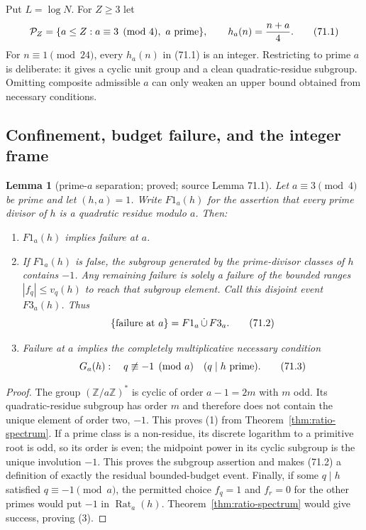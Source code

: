 \documentclass[10pt,reqno]{amsart}
\newtheorem{lemma}[theorem]{Lemma}
\theoremstyle{definition}
\newcommand{\1}{\mathbf 1}
\begin{document}
Put $L=\log N$.  For $Z\geq3$ let
\begin{equation}
 \mathcal P_Z=\{a\leq Z:a\equiv3\pmod4,\ a\hbox{ prime}\},\qquad
 h_a(n)={n+a\over4}.                                      \tag{71.1}
\end{equation}
For $n\equiv1\pmod {24}$, every $h_a(n)$ in (71.1) is an
integer.  Restricting to prime $a$ is deliberate: it gives a cyclic unit
group and a clean quadratic-residue subgroup.  Omitting composite admissible
$a$ can only weaken an upper bound obtained from necessary conditions.

\subsection{Confinement, budget failure, and the integer frame}

\begin{lemma}[prime-$a$ separation; proved; source Lemma 71.1]\label{lem:prime-a-separation}  Let $a\equiv3\pmod4$ be
prime and let $(h,a)=1$.  Write $F1_a(h)$ for the assertion that every
prime divisor of $h$ is a quadratic residue modulo $a$.  Then:

\begin{enumerate}[leftmargin=*]
\item $F1_a(h)$ implies failure at $a$.
\item If $F1_a(h)$ is false, the subgroup generated by the prime-divisor
   classes of $h$ contains $-1$.  Any remaining failure is solely a
   failure of the bounded ranges $|f_q|\leq v_q(h)$ to reach that subgroup
   element.  Call this disjoint event $F3_a(h)$.  Thus
   \begin{equation}
       \{\hbox{failure at }a\}=F1_a\,\dot\cup\,F3_a.       \tag{71.2}
   \end{equation}
\item Failure at $a$ implies the completely multiplicative necessary
   condition
   \begin{equation}
    G_a(h):\quad q\not\equiv-1\pmod a\quad(q\mid h\hbox{ prime}).
                                                                  \tag{71.3}
   \end{equation}
\end{enumerate}

\end{lemma}
\begin{proof} The group $(\mathbb Z/a\mathbb Z)^*$ is cyclic of order
$a-1=2m$ with $m$ odd.  Its quadratic-residue subgroup has order
$m$ and therefore does not contain the unique element of order two,
$-1$.  This proves (1) from Theorem~\ref{thm:ratio-spectrum}.  If a prime class is a
non-residue, its discrete logarithm to a primitive root is odd, so its order
is even; the midpoint power in its cyclic subgroup is the unique involution
$-1$.  This proves the subgroup assertion and makes (71.2) a definition
of exactly the residual bounded-budget event.  Finally, if some $q\mid h$
satisfied $q\equiv-1\pmod a$, the permitted choice $f_q=1$ and
$f_r=0$ for the other primes would put $-1$ in $\operatorname{Rat}_a(h)$.
Theorem~\ref{thm:ratio-spectrum} would give success, proving (3).
\end{proof}
\end{document}
